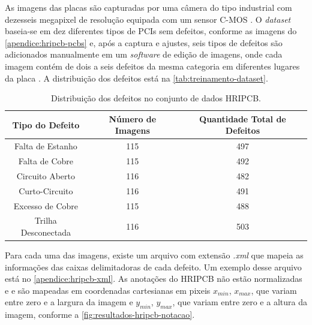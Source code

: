 As imagens das placas são capturadas por uma câmera do tipo industrial com dezesseis megapixel de resolução equipada com um sensor C-MOS \cite{ref:Huang-et-al}. O \textit{dataset} baseia-se em dez diferentes tipos de PCIs sem defeitos, conforme as imagens do \autoref{apendice:hripcb-pcbs} e, após a captura e ajustes, seis tipos de defeitos são adicionados manualmente em um \textit{software} de edição de imagens, onde cada imagem contém de dois a seis defeitos da mesma categoria em diferentes lugares da placa \cite{ref:Huang-et-al}. A distribuição dos defeitos está na \autoref{tab:treinamento-dataset}.

\begin{table}[!h]
\begin{center}
\caption{Distribuição dos defeitos no conjunto de dados HRIPCB.}
\label{tab:treinamento-dataset}
\begin{tabular}{ccc}
\toprule
\textbf{Tipo do Defeito} & \textbf{Número de Imagens} & \textbf{Quantidade Total de Defeitos} \\
\midrule \midrule
Falta de Estanho    & 115   & 497 \\
Falta de Cobre      & 115   & 492 \\
Circuito Aberto     & 116   & 482 \\
Curto-Circuito      & 116   & 491 \\
Excesso de Cobre    & 115   & 488 \\
Trilha Desconectada & 116   & 503 \\
\bottomrule
\end{tabular}
\end{center}
\end{table}

Para cada uma das imagens, existe um arquivo com extensão \textit{.xml} que mapeia as informações das caixas delimitadoras de cada defeito. Um exemplo desse arquivo está no \autoref{apendice:hripcb-xml}.
As anotações do HRIPCB não estão normalizadas e e são mapeadas em coordenadas cartesianas em pixeis $x_{min}$, $x_{max}$, que variam entre zero e a largura da imagem e $y_{min}$, $y_{max}$, que variam entre zero e a altura da imagem, conforme a \autoref{fig:resultados-hripcb-notacao}.

